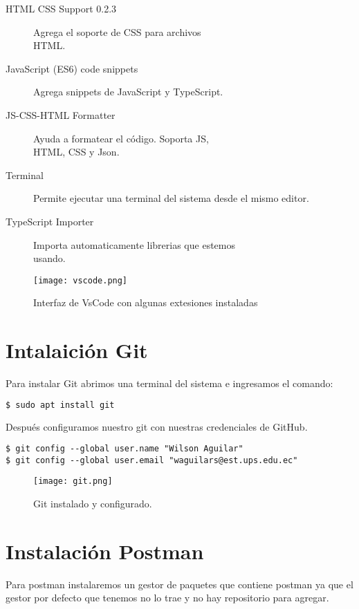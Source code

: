 \documentclass[12pt]{article}
\begin{document}
\begin{description}
    \item[HTML CSS Support 0.2.3]
          Agrega el soporte de CSS para archivos\\
          HTML.
    \item[JavaScript (ES6) code snippets] Agrega snippets de JavaScript y TypeScript.
    \item[JS-CSS-HTML Formatter] Ayuda a formatear el código. Soporta JS,\\ HTML, CSS y Json.
    \item[Terminal] Permite ejecutar una terminal del sistema desde el mismo editor.
    \item[TypeScript Importer] Importa automaticamente librerias que estemos \\usando.
\end{description}

\begin{figure}[H]
    \centering
    \texttt{[image: vscode.png]}
    \caption{Interfaz de VsCode con algunas extesiones instaladas}
\end{figure}

\section{Intalaición Git}
Para instalar Git abrimos una terminal del sistema e ingresamos el comando:

\begin{lstlisting}[language=bash]
$ sudo apt install git
\end{lstlisting}

Después configuramos nuestro git con nuestras credenciales de GitHub.

\begin{lstlisting}
$ git config --global user.name "Wilson Aguilar"
$ git config --global user.email "waguilars@est.ups.edu.ec"
\end{lstlisting}

\begin{figure}[H]
    \centering
    \texttt{[image: git.png]}
    \caption{Git instalado y configurado.}
\end{figure}

\section{Instalación Postman}
Para postman instalaremos un gestor de paquetes que contiene postman ya que el gestor por defecto que tenemos no lo trae y no hay repositorio para agregar.
\end{document}
